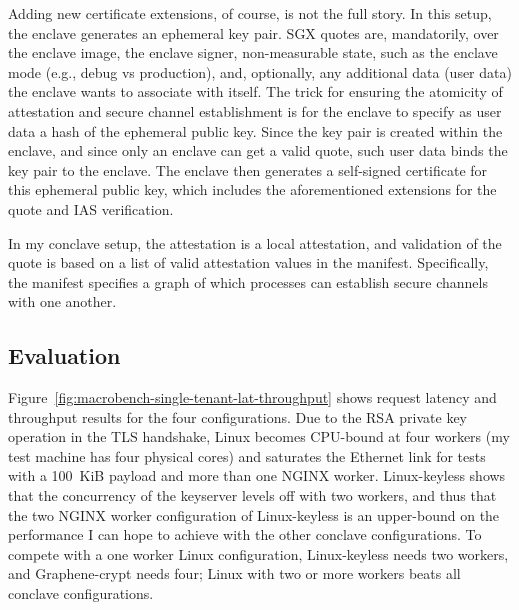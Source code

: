 Adding new certificate extensions, of course, is not the full story.
%
In this setup, the enclave generates an ephemeral key pair.
%
SGX quotes are, mandatorily, over the enclave image, the enclave signer,
non-measurable state, such as the enclave mode (e.g., debug vs production),
and, optionally, any additional data (user data) the enclave wants to
associate with itself.  
%
The trick for ensuring the atomicity of attestation and secure channel
establishment is for the enclave to specify as user data a hash of the ephemeral
public key.
%
Since the key pair is created within the enclave, and since only an enclave can
get a valid quote, such user data binds the key pair to the enclave.
%
The enclave then generates a self-signed certificate for this ephemeral public
key, which includes the aforementioned extensions for the quote and IAS
verification.


In my conclave setup, the attestation is a local attestation, and validation of
the quote is based on a list of valid attestation values in the manifest.
%
Specifically, the manifest specifies a graph of which processes can establish
secure channels with one another.


\subsection{Evaluation}

Figure~\ref{fig:macrobench-single-tenant-lat-throughput} shows
request latency and throughput results for the four configurations.
%
Due to the RSA private key operation in the TLS handshake, Linux becomes
CPU-bound at four workers (my test machine has four physical cores) and
saturates the Ethernet link for tests with a 100~KiB payload and more than one
NGINX worker.
%
Linux-keyless shows that the concurrency of the keyserver levels
off with two workers, and thus that the two NGINX worker configuration of
Linux-keyless is an upper-bound on the performance I can hope to achieve
with the other conclave configurations.
%
%
To compete with a one worker Linux configuration, Linux-keyless needs two
workers, and Graphene-crypt needs four; Linux with two or more workers beats
all conclave configurations.


